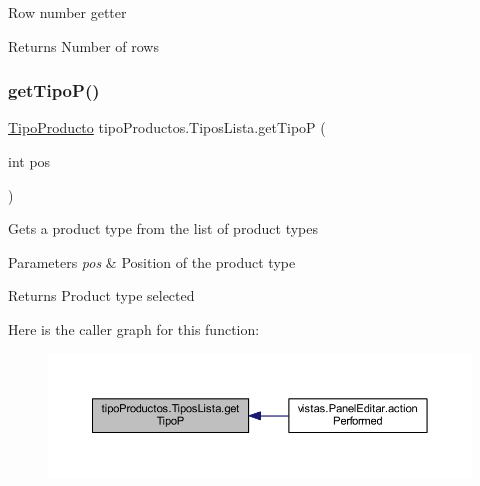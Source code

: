 Row number getter \begin{DoxyReturn}{Returns}
Number of rows 
\end{DoxyReturn}
\mbox{\label{classtipo_productos_1_1_tipos_lista_a825bd94b7e40672ab7d3a84083c21245}} 
\subsubsection{\texorpdfstring{get\+Tipo\+P()}{getTipoP()}}
{\footnotesize\ttfamily \mbox{\hyperlink{classtipo_productos_1_1_tipo_producto}{Tipo\+Producto}} tipo\+Productos.\+Tipos\+Lista.\+get\+TipoP (\begin{DoxyParamCaption}\item[{int}]{pos }\end{DoxyParamCaption})}

Gets a product type from the list of product types 
\begin{DoxyParams}{Parameters}
{\em pos} & Position of the product type \\
\hline
\end{DoxyParams}
\begin{DoxyReturn}{Returns}
Product type selected 
\end{DoxyReturn}
Here is the caller graph for this function\+:
\nopagebreak
\begin{figure}[H]
\begin{center}
\leavevmode
\includegraphics[width=350pt]{classtipo_productos_1_1_tipos_lista_a825bd94b7e40672ab7d3a84083c21245_icgraph}
\end{center}
\end{figure}
\mbox{\label{classtipo_productos_1_1_tipos_lista_a78deb10c0cd2fbc2dfa0de19054e033e}} 
